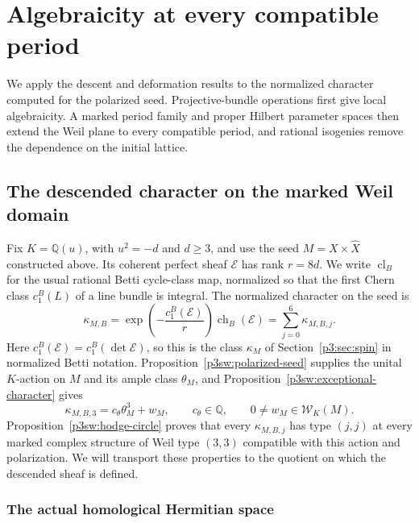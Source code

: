 \documentclass[11pt]{article}
\newcommand{\Q}{\mathbb Q}
\numberwithin{equation}{section}
\begin{document}
\section{Algebraicity at every compatible period}
\label{p3:sec:all-periods}

We apply the descent and deformation results to the normalized character
computed for the polarized seed. Projective-bundle operations first give
local algebraicity. A marked period family and proper Hilbert parameter
spaces then extend the Weil plane to every compatible period, and rational
isogenies remove the dependence on the initial lattice.

\subsection{The descended character on the marked Weil domain}
\label{p3sw:endpoint-marked-domain}

Fix \(K=\Q(u)\), with \(u^2=-d\) and \(d\geq3\), and use the seed
\(M=X\times\widehat X\) constructed above.  Its coherent perfect sheaf
\(\mathcal E\) has rank \(r=8d\).  We write \(\operatorname{cl}_B\) for
the usual rational Betti cycle-class map, normalized so that the first
Chern class \(c_1^B(L)\) of a line bundle is integral.  The normalized
character on the seed is
\begin{equation}
\label{p3sw:endpoint-seed-character}
 \kappa_{M,B}
   =\exp\!\left(-\frac{c_1^B(\mathcal E)}r\right)
       \operatorname{ch}_B(\mathcal E)
   =\sum_{j=0}^6\kappa_{M,B,j}.
\end{equation}
Here \(c_1^B(\mathcal E)=c_1^B(\det\mathcal E)\), so this is the
class \(\kappa_M\) of Section~\ref{p3:sec:spin} in normalized Betti
notation.  Proposition~\ref{p3sw:polarized-seed} supplies the unital
\(K\)-action on \(M\) and its ample class \(\theta_M\), and
Proposition~\ref{p3sw:exceptional-character} gives
\begin{equation}
\label{p3sw:endpoint-exceptional-component}
 \kappa_{M,B,3}=c_\theta\theta_M^3+w_M,\qquad
 c_\theta\in\Q,\qquad 0\ne w_M\in\mathcal W_K(M).
\end{equation}
Proposition~\ref{p3sw:hodge-circle} proves that every
\(\kappa_{M,B,j}\) has type \((j,j)\) at every marked complex
structure of Weil type \((3,3)\) compatible with this action and
polarization.  We will transport these properties to the quotient
on which the descended sheaf is defined.

\subsubsection{The actual homological Hermitian space}
\end{document}
